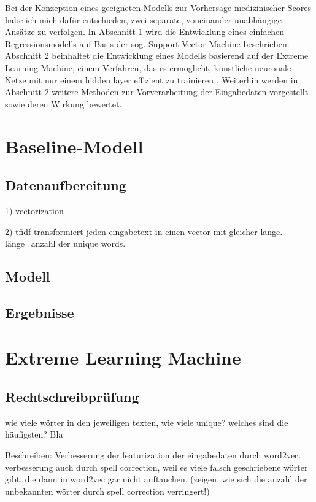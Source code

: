Bei der Konzeption eines geeigneten Modells zur Vorhersage medizinischer Scores habe ich mich dafür entschieden, zwei separate, voneinander unabhängige Ansätze zu verfolgen. In Abschnitt \ref{section:baseline} wird die Entwicklung eines einfachen Regressionsmodells auf Basis der sog. Support Vector Machine beschrieben. Abschnitt \ref{section:ELM} beinhaltet die Entwicklung eines Modells basierend auf der Extreme Learning Machine, einem Verfahren, das es ermöglicht, künstliche neuronale Netze mit nur einem hidden layer effizient zu trainieren \citep{huangExtremeLearningMachine2006}. Weiterhin werden in Abschnitt \ref{section:ELM} weitere Methoden zur Vorverarbeitung der Eingabedaten vorgestellt sowie deren Wirkung bewertet. 

\section{Baseline-Modell}\label{section:baseline}
\subsection{Datenaufbereitung}

1) vectorization

2) tfidf transformiert jeden eingabetext in einen vector mit gleicher länge. länge=anzahl der unique words.
\subsection{Modell}
\subsection{Ergebnisse}
\section{Extreme Learning Machine}\label{section:ELM}

\subsection{Rechtschreibprüfung}
wie viele wörter in den jeweiligen texten, wie viele unique? welches sind die häufigsten? Bla

Beschreiben: Verbesserung der featurization der eingabedaten durch word2vec. verbesserung auch durch spell correction, weil es viele falsch geschriebene wörter gibt, die dann in word2vec gar nicht auftauchen. (zeigen, wie sich die anzahl der unbekannten wörter durch spell correction verringert!)

